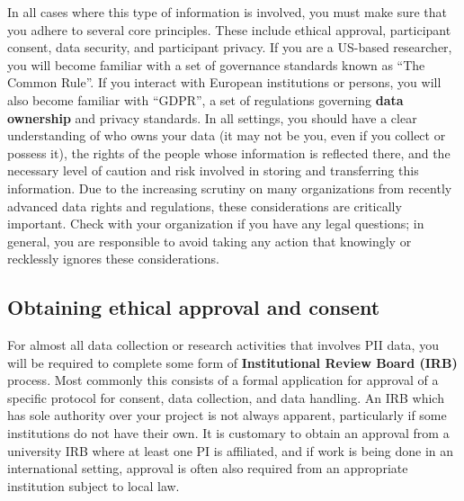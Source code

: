 In all cases where this type of information is involved,
you must make sure that you adhere to several core principles.
These include ethical approval, participant consent, data security, and participant privacy.
If you are a US-based researcher, you will become familiar
with a set of governance standards known as ``The Common Rule''.
If you interact with European institutions or persons,
you will also become familiar with ``GDPR'',
a set of regulations governing \textbf{data ownership} and privacy standards.
In all settings, you should have a clear understanding of
who owns your data (it may not be you, even if you collect or possess it),
the rights of the people whose information is reflected there,
and the necessary level of caution and risk involved in
storing and transferring this information.
Due to the increasing scrutiny on many organizations
from recently advanced data rights and regulations,
these considerations are critically important.
Check with your organization if you have any legal questions;
in general, you are responsible to avoid taking any action that
knowingly or recklessly ignores these considerations.

\subsection{Obtaining ethical approval and consent}

For almost all data collection or research activities that involves PII data,
you will be required to complete some form of \textbf{Institutional Review Board (IRB)} process.
Most commonly this consists of a formal application for approval of a specific
protocol for consent, data collection, and data handling.
An IRB which has sole authority over your project is not always apparent,
particularly if some institutions do not have their own.
It is customary to obtain an approval from a university IRB
where at least one PI is affiliated,
and if work is being done in an international setting,
approval is often also required
from an appropriate institution subject to local law.

